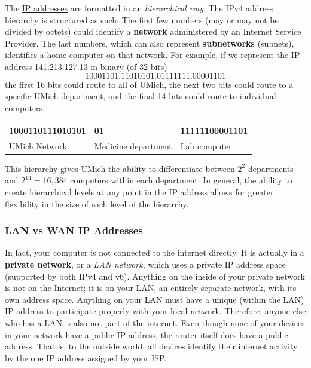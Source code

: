 \documentclass{article}
\newcounter{definition}[section]
\newcounter{example}[section]
\begin{document}
  \begin{definition}
    \label{def:hierarchy-of-ip-addresses}
  The \hyperref[def:ip-addresses]{IP addresses} are formatted in an \textit{hierarchical way}. The IPv4 address hierarchy is structured as such: The first few numbers (may or may not be divided by octets) could identify a \textbf{network} administered by an Internet Service Provider. The last numbers, which can also represent \textbf{subnetworks} (subnets), identifies a home computer on that network. For example, if we represent the IP address 141.213.127.13 in binary (of 32 bits)
  \begin{equation}
    10001101.11010101.01111111.00001101
  \end{equation}
  the first 16 bits could route to all of UMich, the next two bits could route to a specific UMich department, and the final 14 bits could route to individual computers. 
  \begin{center}
  \begin{tabular}{l|l|l}
      1000110111010101 & 01 & 11111100001101  \\
      \hline
      UMich Network & Medicine department & Lab computer 
  \end{tabular}
  \end{center}
  This hierarchy gives UMich the ability to differentiate between $2^2$ departments and $2^{14} = 16,384$ computers within each department. In general, the ability to create hierarchical levels at any point in the IP address allows for greater flexibility in the size of each level of the hierarchy. 
  \end{definition}

  \subsubsection{LAN vs WAN IP Addresses}
  In fact, your computer is not connected to the internet directly. It is actually in a \textbf{private network}, or a \textit{LAN network}, which uses a private IP address space (supported by both IPv4 and v6). Anything on the inside of your private network is not on the Internet; it is on your LAN, an entirely separate network, with its own address space. Anything on your LAN must have a unique (within the LAN) IP address to participate properly with your local network. Therefore, anyone else who has a LAN is also not part of the internet. Even though none of your devices in your network have a public IP address, the router itself does have a public address. That is, to the outside world, all devices identify their internet activity by the one IP address assigned by your ISP.  
\end{document}
